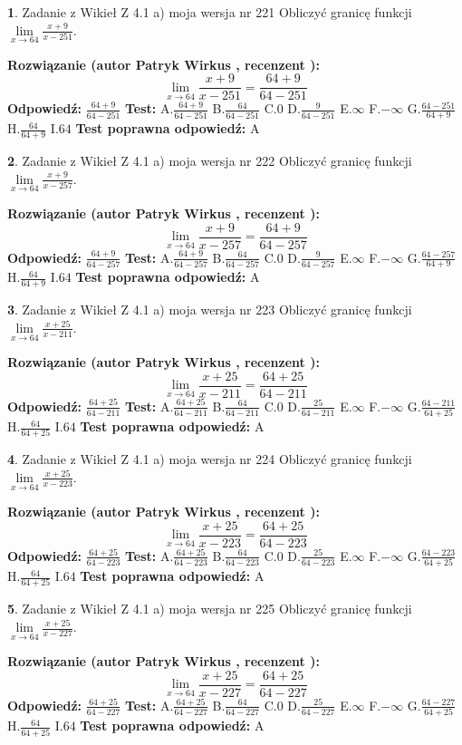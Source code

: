 \documentclass[12pt, a4paper]{article}
\theoremstyle{definition} %
\newtheorem{zad}{}
\newcommand{\zadStart}[1]{\begin{zad}#1\newline}
\newcommand{\zadStop}{\end{zad}}
\newcommand{\rozwStart}[2]{\noindent \textbf{Rozwiązanie (autor #1 , recenzent #2): }\newline}
\newcommand{\rozwStop}{\newline}
\newcommand{\odpStart}{\noindent \textbf{Odpowiedź:}\newline}
\newcommand{\odpStop}{\newline}
\newcommand{\testStart}{\noindent \textbf{Test:}\newline}
\newcommand{\testStop}{\newline}
\newcommand{\kluczStart}{\noindent \textbf{Test poprawna odpowiedź:}\newline}
\newcommand{\kluczStop}{\newline}
\begin{document}
\zadStart{Zadanie z Wikieł Z 4.1 a) moja wersja nr 221}
Obliczyć granicę funkcji $\lim\limits_{x\to64}\frac{x+9}{x-251}$.
\zadStop
\rozwStart{Patryk Wirkus}{}
$$\lim\limits_{x\to64}\frac{x+9}{x-251} = \frac{64+9}{64-251}$$
\rozwStop
\odpStart
$\frac{64+9}{64-251}$
\odpStop
\testStart
A.$\frac{64+9}{64-251}$
B.$\frac{64}{64-251}$
C.$0$
D.$\frac{9}{64-251}$
E.$\infty$
F.$-\infty$
G.$\frac{64-251}{64+9}$
H.$\frac{64}{64+9}$
I.$64$
\testStop
\kluczStart
A
\kluczStop



\zadStart{Zadanie z Wikieł Z 4.1 a) moja wersja nr 222}
Obliczyć granicę funkcji $\lim\limits_{x\to64}\frac{x+9}{x-257}$.
\zadStop
\rozwStart{Patryk Wirkus}{}
$$\lim\limits_{x\to64}\frac{x+9}{x-257} = \frac{64+9}{64-257}$$
\rozwStop
\odpStart
$\frac{64+9}{64-257}$
\odpStop
\testStart
A.$\frac{64+9}{64-257}$
B.$\frac{64}{64-257}$
C.$0$
D.$\frac{9}{64-257}$
E.$\infty$
F.$-\infty$
G.$\frac{64-257}{64+9}$
H.$\frac{64}{64+9}$
I.$64$
\testStop
\kluczStart
A
\kluczStop



\zadStart{Zadanie z Wikieł Z 4.1 a) moja wersja nr 223}
Obliczyć granicę funkcji $\lim\limits_{x\to64}\frac{x+25}{x-211}$.
\zadStop
\rozwStart{Patryk Wirkus}{}
$$\lim\limits_{x\to64}\frac{x+25}{x-211} = \frac{64+25}{64-211}$$
\rozwStop
\odpStart
$\frac{64+25}{64-211}$
\odpStop
\testStart
A.$\frac{64+25}{64-211}$
B.$\frac{64}{64-211}$
C.$0$
D.$\frac{25}{64-211}$
E.$\infty$
F.$-\infty$
G.$\frac{64-211}{64+25}$
H.$\frac{64}{64+25}$
I.$64$
\testStop
\kluczStart
A
\kluczStop



\zadStart{Zadanie z Wikieł Z 4.1 a) moja wersja nr 224}
Obliczyć granicę funkcji $\lim\limits_{x\to64}\frac{x+25}{x-223}$.
\zadStop
\rozwStart{Patryk Wirkus}{}
$$\lim\limits_{x\to64}\frac{x+25}{x-223} = \frac{64+25}{64-223}$$
\rozwStop
\odpStart
$\frac{64+25}{64-223}$
\odpStop
\testStart
A.$\frac{64+25}{64-223}$
B.$\frac{64}{64-223}$
C.$0$
D.$\frac{25}{64-223}$
E.$\infty$
F.$-\infty$
G.$\frac{64-223}{64+25}$
H.$\frac{64}{64+25}$
I.$64$
\testStop
\kluczStart
A
\kluczStop



\zadStart{Zadanie z Wikieł Z 4.1 a) moja wersja nr 225}
Obliczyć granicę funkcji $\lim\limits_{x\to64}\frac{x+25}{x-227}$.
\zadStop
\rozwStart{Patryk Wirkus}{}
$$\lim\limits_{x\to64}\frac{x+25}{x-227} = \frac{64+25}{64-227}$$
\rozwStop
\odpStart
$\frac{64+25}{64-227}$
\odpStop
\testStart
A.$\frac{64+25}{64-227}$
B.$\frac{64}{64-227}$
C.$0$
D.$\frac{25}{64-227}$
E.$\infty$
F.$-\infty$
G.$\frac{64-227}{64+25}$
H.$\frac{64}{64+25}$
I.$64$
\testStop
\kluczStart
A
\kluczStop
\end{document}
